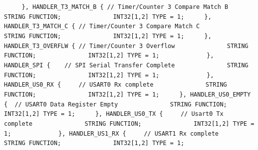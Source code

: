 {{{{\lstinline!	    }, HANDLER_T3_MATCH_B {	// Timer/Counter 3 Compare Match B! \newline
\lstinline!              STRING FUNCTION;! \newline
\lstinline!              INT32[1,2] TYPE = 1;! \newline
\lstinline!	    }, HANDLER_T3_MATCH_C {	// Timer/Counter 3 Compare Match C! \newline
\lstinline!              STRING FUNCTION;! \newline
\lstinline!              INT32[1,2] TYPE = 1;! \newline
\lstinline!	    }, HANDLER_T3_OVERFLW {	// Timer/Counter 3 Overflow! \newline
\lstinline!              STRING FUNCTION;! \newline
\lstinline!              INT32[1,2] TYPE = 1;! \newline
\lstinline!	      ! \newline
\lstinline!	    }, HANDLER_SPI { 	// SPI Serial Transfer Complete! \newline
\lstinline!              STRING FUNCTION;! \newline
\lstinline!              INT32[1,2] TYPE = 1;! \newline
\lstinline!	      ! \newline
\lstinline!	    }, HANDLER_US0_RX {  	// USART0 Rx complete! \newline
\lstinline!              STRING FUNCTION;! \newline
\lstinline!              INT32[1,2] TYPE = 1;! \newline
\lstinline!	    }, HANDLER_US0_EMPTY {	// USART0 Data Register Empty! \newline
\lstinline!              STRING FUNCTION;! \newline
\lstinline!              INT32[1,2] TYPE = 1;! \newline
\lstinline!	    }, HANDLER_US0_TX {  	// Usart0 Tx complete! \newline
\lstinline!              STRING FUNCTION;! \newline
\lstinline!              INT32[1,2] TYPE = 1;! \newline
\lstinline!	      ! \newline
\lstinline!	    }, HANDLER_US1_RX {  	// USART1 Rx complete! \newline
\lstinline!              STRING FUNCTION;! \newline
\lstinline!              INT32[1,2] TYPE = 1;! \newline
}}}}
